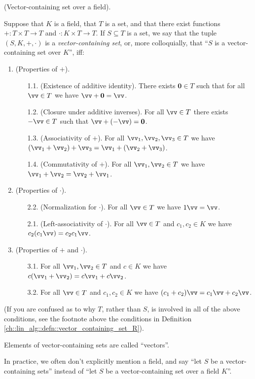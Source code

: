 \begin{defn}
\label{ch::lin_alg::defn::vector_space}
    (Vector-containing set over a field).
    
    Suppose that $K$ is a field, that $T$ is a set, and that there exist functions $+:T \times T \rightarrow T$ and $\cdot:K \times T \rightarrow T$. If $S \subseteq T$ is a set, we say that the tuple $(S, K, +, \cdot)$ is a \textit{vector-containing set}, or, more colloquially, that ``$S$ is a vector-containing set over $K$'', iff:
    
    \begin{enumerate}
        \item (Properties of $+$).
        \begin{enumerate}
                \item[1.1.] (Existence of additive identity). There exists $\mathbf{0} \in T$ such that for all $\vv \in T$ we have $\vv + \mathbf{0} = \vv$.
                \item[1.2.] (Closure under additive inverses). For all $\vv \in T$ there exists $-\vv \in T$ such that $\vv + (-\vv) = \mathbf{0}$.
                \item[1.3.] (Associativity of $+$). For all $\vv_1, \vv_2, \vv_3 \in T$ we have $(\vv_1 + \vv_2) + \vv_3 = \vv_1 + (\vv_2 + \vv_3)$.
                \item[1.4.] (Commutativity of $+$). For all $\vv_1, \vv_2 \in T$ we have $\vv_1 + \vv_2 = \vv_2 + \vv_1$.
            \end{enumerate}
        \item (Properties of $\cdot$).
        \begin{enumerate}
            \item[2.2.] (Normalization for $\cdot$). For all $\vv \in T$ we have $1 \vv = \vv$.
            \item[2.1.] (Left-associativity of $\cdot$). For all $\vv \in T$ and $c_1, c_2 \in K$ we have $c_2 (c_1 \vv) = c_2 c_1 \vv$.
        \end{enumerate}
        \item (Properties of $+$ and $\cdot$).
        \begin{enumerate}
            \item[3.1.] For all $\vv_1, \vv_2 \in T$ and $c \in K$ we have $c(\vv_1 + \vv_2) = c \vv_1 + c \vv_2$.
            \item[3.2.] For all $\vv \in T$ and $c_1, c_2 \in K$ we have $(c_1 + c_2)\vv = c_1 \vv + c_2 \vv$.
        \end{enumerate}
    \end{enumerate}

    (If you are confused as to why $T$, rather than $S$, is involved in all of the above conditions, see the footnote above the conditions in Definition \ref{ch::lin_alg::defn::vector_containing_set_R}).
    
    Elements of vector-containing sets are called ``vectors''.
    
    In practice, we often don't explicitly mention a field, and say ``let $S$ be a vector-containing sets'' instead of ``let $S$ be a vector-containing set over a field $K$''.
\end{defn}

